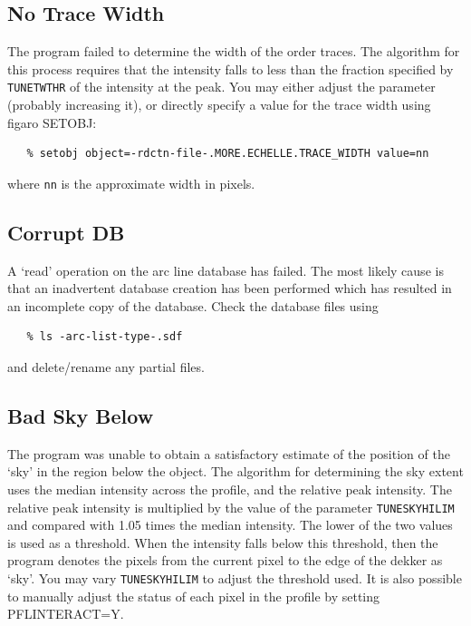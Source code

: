 \documentclass[twoside,11pt]{article}
\newcommand{\xref}[3]{#1}
\newcommand{\xlabel}[1]{}
\renewcommand{\_}{\texttt{\symbol{95}}}
\newcommand{\mlabel}[1]{\xlabel{#1}\label{#1}}
\newcommand{\myindex}[1]{\index{#1}}
\newcommand{\myindex}[1]{}
\begin{document}
\subsection{\mlabel{no_trace_width} No Trace Width}

The program failed to determine the width of the order traces. The
algorithm for this process requires that the intensity falls to less
than the fraction specified by \texttt{TUNE\_TWTHR} of the intensity at the
peak.  You may either adjust the parameter (probably increasing it),
or directly specify a value for the trace width using
\xref{{\sc figaro} SETOBJ}{sun86}{SETOBJ}:

\begin{verbatim}
   % setobj object=-rdctn-file-.MORE.ECHELLE.TRACE_WIDTH value=nn
\end{verbatim}

where {\tt nn} is the approximate width in pixels.


\subsection{\mlabel{corrupt_db} Corrupt DB}

A `read' operation on the arc line database has failed. The most likely
cause is that an inadvertent database creation has been performed which
has resulted in an incomplete copy of the database.  Check the database
files using

\begin{verbatim}
   % ls -arc-list-type-.sdf
\end{verbatim}

and delete/rename any partial files.

\subsection{\mlabel{bad_sky_below} Bad Sky Below}
\myindex{Object limits!failure}

The program was unable to obtain a satisfactory estimate of the position
of the `sky' in the region below the object. The algorithm for
determining the sky extent uses the median intensity across the profile,
and the relative peak intensity. The relative peak intensity is
multiplied by the value of the parameter \texttt{TUNE\_SKYHILIM} and compared
with 1.05 times the median intensity. The lower of the two values is used as
a threshold. When the intensity falls below this threshold,  then the
program denotes the pixels from the current pixel to the edge of the
dekker as `sky'.  You may vary \texttt{TUNE\_SKYHILIM} to adjust the
threshold used. It is also possible to manually adjust the status of
each pixel in the profile by setting PFL\_INTERACT=Y.
\end{document}
